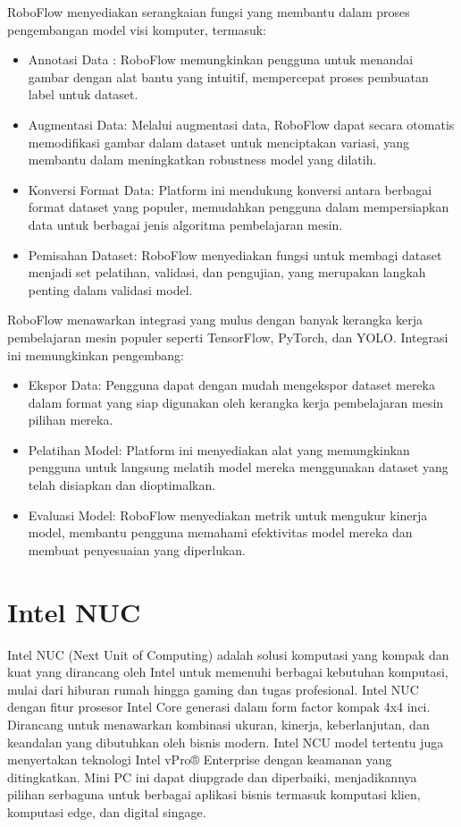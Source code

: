 RoboFlow menyediakan serangkaian fungsi yang membantu dalam proses pengembangan model visi komputer, termasuk:
\begin{itemize}
    \item Annotasi Data : RoboFlow memungkinkan pengguna untuk menandai gambar dengan alat bantu yang intuitif, mempercepat proses pembuatan label untuk dataset.
    \item Augmentasi Data: Melalui augmentasi data, RoboFlow dapat secara otomatis memodifikasi gambar dalam dataset untuk menciptakan variasi, yang membantu dalam meningkatkan robustness model yang dilatih.
    \item Konversi Format Data: Platform ini mendukung konversi antara berbagai format dataset yang populer, memudahkan pengguna dalam mempersiapkan data untuk berbagai jenis algoritma pembelajaran mesin.
    \item Pemisahan Dataset: RoboFlow menyediakan fungsi untuk membagi dataset menjadi set pelatihan, validasi, dan pengujian, yang merupakan langkah penting dalam validasi model.
\end{itemize}
RoboFlow menawarkan integrasi yang mulus dengan banyak kerangka kerja pembelajaran mesin populer seperti TensorFlow, PyTorch, dan YOLO. Integrasi ini memungkinkan pengembang:
\begin{itemize}
    \item Ekspor Data: Pengguna dapat dengan mudah mengekspor dataset mereka dalam format yang siap digunakan oleh kerangka kerja pembelajaran mesin pilihan mereka.
    \item Pelatihan Model: Platform ini menyediakan alat yang memungkinkan pengguna untuk langsung melatih model mereka menggunakan dataset yang telah disiapkan dan dioptimalkan.
    \item Evaluasi Model: RoboFlow menyediakan metrik untuk mengukur kinerja model, membantu pengguna memahami efektivitas model mereka dan membuat penyesuaian yang diperlukan.
\end{itemize}

\section{Intel NUC}
Intel NUC (Next Unit of Computing) adalah solusi komputasi yang kompak dan kuat yang dirancang oleh Intel untuk memenuhi berbagai kebutuhan komputasi, mulai dari hiburan rumah hingga gaming dan tugas profesional. Intel NUC dengan fitur prosesor Intel Core generasi dalam form factor kompak 4x4 inci. Dirancang untuk menawarkan kombinasi ukuran, kinerja, keberlanjutan, dan keandalan yang dibutuhkan oleh bisnis modern. Intel NCU model tertentu juga menyertakan teknologi Intel vPro® Enterprise dengan keamanan yang ditingkatkan. Mini PC ini dapat diupgrade dan diperbaiki, menjadikannya pilihan serbaguna untuk berbagai aplikasi bisnis termasuk komputasi klien, komputasi edge, dan digital singage.

